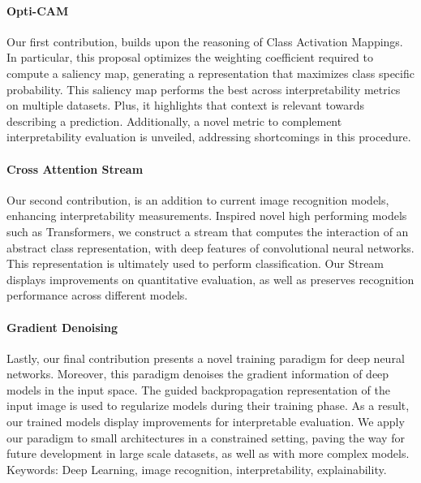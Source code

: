 \paragraph{Opti-CAM} Our first contribution, builds upon the reasoning of Class Activation 
Mappings. In particular, this proposal optimizes the weighting coefficient required to compute a 
saliency map, generating a representation that maximizes class specific probability.  This saliency 
map performs the best across interpretability metrics on multiple datasets.  Plus, it highlights 
that context is relevant towards describing a prediction. Additionally, a novel metric to complement 
interpretability evaluation is unveiled, addressing shortcomings in this procedure.\\

\paragraph{Cross Attention Stream}  Our second contribution, is an addition to current image 
recognition models, enhancing interpretability measurements. Inspired novel high performing models 
such as Transformers, we construct a stream that computes the interaction of an abstract class 
representation, with deep features of convolutional neural networks. This representation is 
ultimately used to perform classification. Our Stream displays improvements on quantitative 
evaluation, as well as preserves recognition performance across different models.\\

\paragraph{Gradient Denoising} Lastly, our final contribution presents a novel training paradigm 
for deep neural networks. Moreover, this paradigm denoises the gradient information of deep models 
in the input space. The guided backpropagation representation of the input image is used to 
regularize models during their training phase. As a result, our trained models display improvements 
for interpretable evaluation. We apply our paradigm to small architectures in a constrained 
setting, paving the way for future development in large scale datasets, as well as with more 
complex models.\\

\vspace{0.5cm}
Keywords: Deep Learning, image recognition, interpretability, explainability.

